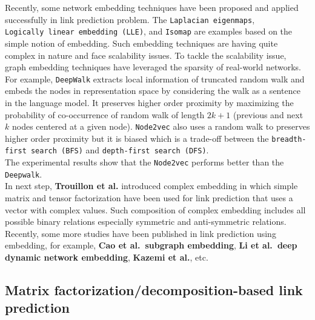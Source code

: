 Recently, some network embedding techniques have been proposed and
applied successfully in link prediction problem. The
\texttt{Laplacian\ eigenmaps},
\texttt{Logically\ linear\ embedding\ (LLE)}, and \texttt{Isomap} are
examples based on the simple notion of embedding. Such embedding
techniques are having quite complex in nature and face scalability
issues. To tackle the scalability issue, graph embedding techniques have
leveraged the sparsity of real-world networks. For example,
\texttt{DeepWalk} extracts local information of truncated random walk
and embeds the nodes in representation space by considering the walk as
a sentence in the language model. It preserves higher order proximity by
maximizing the probability of co-occurrence of random walk of length
\(2k + 1\) (previous and next \(k\) nodes centered at a given node).
\texttt{Node2vec} also uses a random walk to preserves higher order
proximity but it is biased which is a trade-off between the
\texttt{breadth-first\ search\ (BFS)} and
\texttt{depth-first\ search\ (DFS)}.\\

The experimental results show that the \texttt{Node2vec} performs better
than the \texttt{Deepwalk}.\\

In next step, \textbf{Trouillon et al.} introduced complex embedding in
which simple matrix and tensor factorization have been used for link
prediction that uses a vector with complex values. Such composition of
complex embedding includes all possible binary relations especially
symmetric and anti-symmetric relations. Recently, some more studies have
been published in link prediction using embedding, for example,
\textbf{Cao et al.~subgraph embedding}, \textbf{Li et al.~deep dynamic
    network embedding}, \textbf{Kazemi et al.}, etc.

\subsection{Matrix factorization/decomposition-based link prediction}


